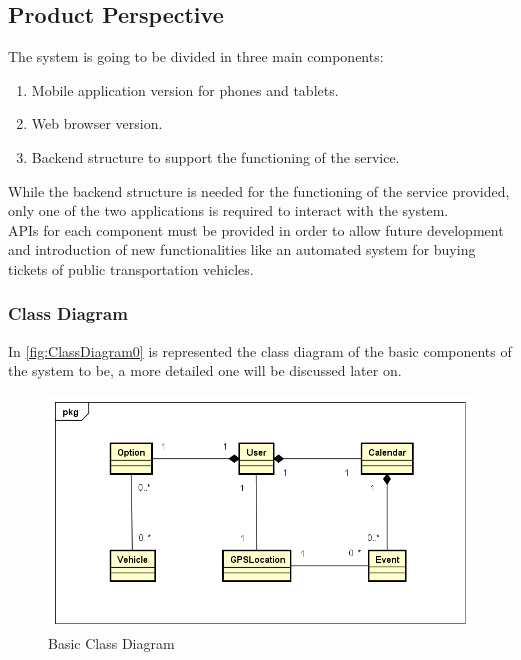 \subsection{Product Perspective}
The system is going to be divided in three main components:
\begin{enumerate}
\item Mobile application version for phones and tablets.
\item Web browser version.
\item Backend structure to support the functioning of the service.
\end{enumerate}
While the backend structure is needed for the functioning of the service provided, only one of the two applications is required to interact with the system.\\
APIs for each component must be provided in order to allow future development and introduction of new functionalities like an automated system for buying tickets of public transportation vehicles.
\subsubsection*{Class Diagram}
In \autoref{fig:ClassDiagram0} is represented the class diagram of the basic components of the system to be, a more detailed one will be discussed later on.
\begin{figure}[h]
\centering
	\includegraphics[width=\textwidth, keepaspectratio=true]{Img/ClassDiagram0}
	\caption{Basic Class Diagram}
	\label{fig:ClassDiagram0}
\end{figure}
\newpage

